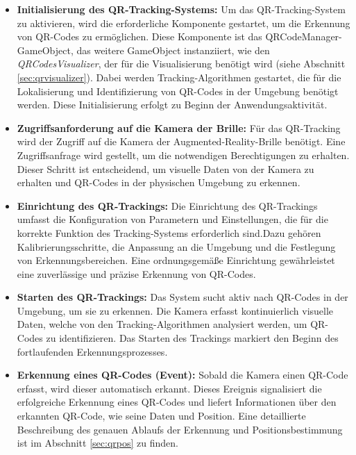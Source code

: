 \begin{itemize}

    \item \textbf{Initialisierung des QR-Tracking-Systems:}
    Um das QR-Tracking-System zu aktivieren, wird die erforderliche Komponente gestartet, um die Erkennung von QR-Codes zu ermöglichen. Diese Komponente ist das QRCodeManager-GameObject, das weitere GameObject instanziiert, wie den \textit{QRCodesVisualizer}, der für die Visualisierung benötigt wird (siehe Abschnitt \ref{sec:qrvisualizer}). Dabei werden Tracking-Algorithmen gestartet, die für die Lokalisierung und Identifizierung von QR-Codes in der Umgebung benötigt werden. Diese Initialisierung erfolgt zu Beginn der Anwendungsaktivität.

    \item \textbf{Zugriffsanforderung auf die Kamera der Brille:}
    Für das QR-Tracking wird der Zugriff auf die Kamera der Augmented-Reality-Brille benötigt. Eine Zugriffsanfrage wird
    gestellt, um die notwendigen Berechtigungen zu erhalten. Dieser Schritt ist entscheidend, um visuelle Daten von der Kamera
    zu erhalten und QR-Codes in der physischen Umgebung zu erkennen.

    \item \textbf{Einrichtung des QR-Trackings:}
    Die Einrichtung des QR-Trackings umfasst die Konfiguration von Parametern und Einstellungen, die für die korrekte
    Funktion des Tracking-Systems erforderlich sind.Dazu gehören Kalibrierungsschritte, die Anpassung an die Umgebung und die
    Festlegung von Erkennungsbereichen. Eine ordnungsgemäße Einrichtung gewährleistet eine zuverlässige und präzise Erkennung von QR-Codes.

    \item \textbf{Starten des QR-Trackings:}
    Das System sucht aktiv nach QR-Codes in der Umgebung, um sie zu erkennen. Die Kamera erfasst kontinuierlich visuelle
    Daten, welche von den Tracking-Algorithmen analysiert werden, um QR-Codes zu identifizieren. Das Starten des Trackings
    markiert den Beginn des fortlaufenden Erkennungsprozesses.

    \item \textbf{Erkennung eines QR-Codes (Event):}
    Sobald die Kamera einen QR-Code erfasst, wird dieser automatisch erkannt. Dieses Ereignis signalisiert die erfolgreiche Erkennung eines QR-Codes und liefert Informationen über den erkannten QR-Code, wie seine Daten und Position. Eine detaillierte Beschreibung des genauen Ablaufs der Erkennung und Positionsbestimmung ist im Abschnitt \ref{sec:qrpos} zu finden.


\end{itemize}
